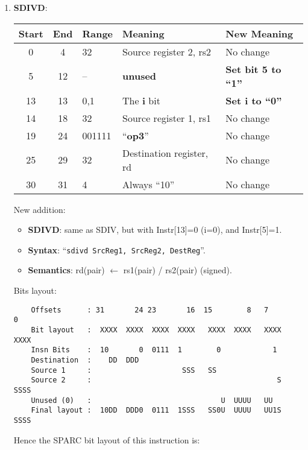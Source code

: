 \begin{enumerate}
\item \textbf{SDIVD}:\\
  \begin{center}
    \begin{tabular}[p]{|c|c|l|l|l|}
      \hline
      \textbf{Start} & \textbf{End} & \textbf{Range} & \textbf{Meaning} &
                                                                          \textbf{New Meaning}\\
      \hline
      0 & 4 & 32 & Source register 2, rs2 & No change \\
      5 & 12 & -- & \textbf{unused} & \textbf{Set bit 5 to ``1''} \\
      13 & 13 & 0,1 & The \textbf{i} bit & \textbf{Set i to ``0''} \\
      14 & 18 & 32 & Source register 1, rs1 & No change \\
      19 & 24 & 001111 & ``\textbf{op3}'' & No change \\
      25 & 29 & 32 & Destination register, rd & No change \\
      30 & 31 & 4 & Always ``10'' & No change \\
      \hline
    \end{tabular}
  \end{center}
  New addition:
  \begin{itemize}
  \item []\textbf{SDIVD}: same as SDIV, but with Instr[13]=0 (i=0), and
    Instr[5]=1.
  \item []\textbf{Syntax}: ``\texttt{sdivd  SrcReg1, SrcReg2, DestReg}''.
  \item []\textbf{Semantics}: rd(pair) $\leftarrow$ rs1(pair) /
    rs2(pair) (signed).
  \end{itemize}
  Bits layout:
\begin{verbatim}
    Offsets      : 31       24 23       16  15        8   7        0
    Bit layout   :  XXXX  XXXX  XXXX  XXXX   XXXX  XXXX   XXXX  XXXX
    Insn Bits    :  10       0  0111  1        0            1       
    Destination  :    DD  DDD                                       
    Source 1     :                     SSS   SS
    Source 2     :                                           S  SSSS
    Unused (0)   :                              U  UUUU   UU        
    Final layout :  10DD  DDD0  0111  1SSS   SS0U  UUUU   UU1S  SSSS
\end{verbatim}

  Hence the SPARC bit layout of this instruction is:


\end{enumerate}

